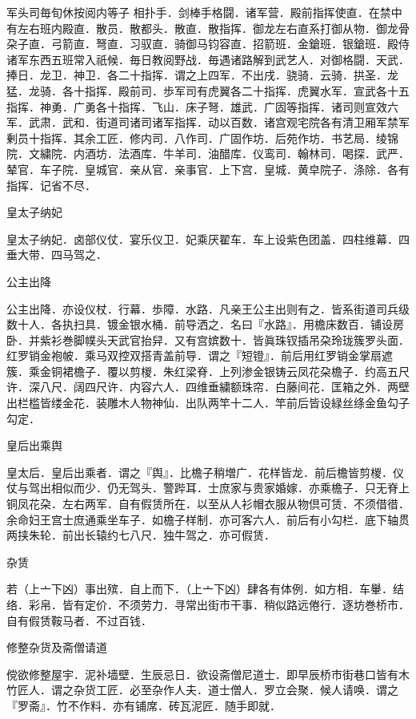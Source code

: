 \documentclass[]{article}
\begin{document}
军头司毎旬休按阅内等子
相扑手．剑棒手格闘．诸军营．殿前指挥使直．在禁中有左右班内殿直．散员．散都头．散直．散指挥．御龙左右直系打御从物．御龙骨朶子直．弓箭直．弩直．习驭直．骑御马钧容直．招箭班．金鎗班．银鎗班．殿侍诸军东西五班常入祇候．毎日教阅野战．毎遇诸路解到武艺人．对御格闘．天武．捧日．龙卫．神卫．各二十指挥．谓之上四军．不出戌．骁骑．云骑．拱圣．龙猛．龙骑．各十指挥．殿前司．歩军司有虎翼各二十指挥．虎翼水军．宣武各十五指挥．神勇．广勇各十指挥．飞山．床子弩．雄武．广固等指挥．诸司则宣效六军．武肃．武和．街道司诸司诸军指挥．动以百数．诸宫观宅院各有清卫厢军禁军剰员十指挥．其余工匠．修内司．八作司．广固作坊．后苑作坊．书艺局．绫锦院．文繍院．内酒坊．法酒库．牛羊司．油醋库．仪鸾司．翰林司．喝探．武严．辇官．车子院．皇城官．亲从官．亲事官．上下宫．皇城．黄皁院子．涤除．各有指挥．记省不尽．

皇太子纳妃

皇太子纳妃．卤部仪仗．宴乐仪卫．妃乘厌翟车．车上设紫色团盖．四柱维幕．四垂大带．四马驾之．

公主出降

公主出降．亦设仪杖．行幕．歩障．水路．凡亲王公主出则有之．皆系街道司兵级数十人．各执扫具．镀金银水桶．前导洒之．名曰『水路』．用檐床数百．铺设房卧．并紫衫巻脚幞头天武官抬舁．又有宫嫔数十．皆眞珠钗插吊朶玲珑簇罗头面．红罗销金袍帔．乘马双控双搭青盖前导．谓之『短镫』．前后用红罗销金掌扇遮簇．乘金铜裙檐子．覆以剪椶．朱红梁脊．上列渗金银铸云凤花朶檐子．约高五尺许．深八尺．阔四尺许．内容六人．四维垂繍额珠帘．白藤间花．匡箱之外．两壁出栏槛皆缕金花．装雕木人物神仙．出队两竿十二人．竿前后皆设緑丝绦金鱼勾子勾定．

皇后出乘舆

皇太后．皇后出乘者．谓之『舆』．比檐子稍増广．花样皆龙．前后檐皆剪椶．仪仗与驾出相似而少．仍无驾头．警跸耳．士庶家与贵家婚嫁．亦乘檐子．只无脊上铜凤花朶．左右两军．自有假赁所在．以至从人衫帽衣服从物倶可赁．不须借徣．余命妇王宫士庶通乘坐车子．如檐子样制．亦可客六人．前后有小勾栏．底下轴贯两挟朱轮．前出长辕约七八尺．独牛驾之．亦可假赁．

杂赁

若（上亠下凶）事出殡．自上而下．（上亠下凶）肆各有体例．如方相．车轝．结络．彩帛．皆有定价．不须劳力．寻常出街市干事．稍似路远倦行．逐坊巻桥市．自有假赁鞍马者．不过百钱．

修整杂货及斋僧请道

傥欲修整屋宇．泥补墙壁．生辰忌日．欲设斋僧尼道士．即早辰桥市街巷口皆有木竹匠人．谓之杂货工匠．必至杂作人夫．道士僧人．罗立会聚．候人请唤．谓之『罗斋』．竹不作料．亦有铺席．砖瓦泥匠．随手即就．
\end{document}
